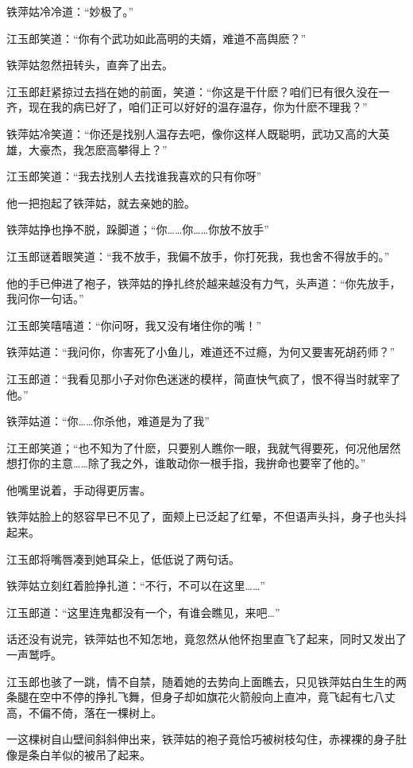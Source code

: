 \documentclass[12pt,oneside]{book}
\begin{document}
铁萍姑冷冷道：``妙极了。''

江玉郎笑道：``你有个武功如此高明的夫婿，难道不高舆麽？''

铁萍姑忽然扭转头，直奔了出去。

江玉郎赶紧掠过去挡在她的前面，笑道：``你这是干什麽？咱们已有很久没在一齐，现在我的病已好了，咱们正可以好好的温存温存，你为什麽不理我？''

铁萍姑冷笑道：``你还是找别人温存去吧，像你这样人既聪明，武功又高的大英雄，大豪杰，我怎麽高攀得上？''

江玉郎笑道：``我去找别人去找谁我喜欢的只有你呀''

他一把抱起了铁萍姑，就去亲她的脸。

铁萍姑挣也挣不脱，跺脚道；``你\ldots\ldots 你\ldots\ldots 你放不放手''

江玉郎谜着眼笑道：``我不放手，我偏不放手，你打死我，我也舍不得放手的。''

他的手已伸进了袍子，铁萍姑的挣扎终於越来越没有力气，头声道：``你先放手，我问你一句话。''

江玉郎笑嘻嘻道：``你问呀，我又没有堵住你的嘴！''

铁萍姑道：``我问你，你害死了小鱼儿，难道还不过瘾，为何又要害死胡药师？''

江玉郎道：``我看见那小子对你色迷迷的模样，简直快气疯了，恨不得当时就宰了他。''

铁萍姑道：``你\ldots\ldots 你杀他，难道是为了我''

江王郎笑道；``也不知为了什麽，只要别人瞧你一眼，我就气得要死，何况他居然想打你的主意\ldots\ldots 除了我之外，谁敢动你一根手指，我拚命也要宰了他的。''

他嘴里说着，手动得更厉害。

铁萍姑脸上的怒容早已不见了，面颊上已泛起了红晕，不但语声头抖，身子也头抖起来。

江玉郎将嘴唇凑到她耳朵上，低低说了两句话。

铁萍姑立刻红着脸挣扎道：``不行，不可以在这里\ldots\ldots{}''

江玉郎道：``这里连鬼都没有一个，有谁会瞧见，来吧\ldots{}''

话还没有说完，铁萍姑也不知怎地，竟忽然从他怀抱里直飞了起来，同时又发出了一声鹫呼。

江玉郎也骇了一跳，情不自禁，随着她的去势向上面瞧去，只见铁萍姑白生生的两条腿在空中不停的挣扎飞舞，但身子却如旗花火箭般向上直冲，竟飞起有七八丈高，不偏不倚，落在一棵树上。

一这棵树自山壁间斜斜伸出来，铁萍姑的袍子竟恰巧被树枝勾住，赤裸裸的身子肚像是条白羊似的被吊了起来。
\end{document}
